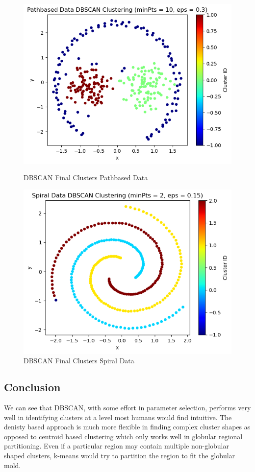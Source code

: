 \documentclass{article}
\begin{document}
\begin{figure}[H]
    \centering
    \begin{minipage}[b]{0.49\textwidth}
        \centering
        \includegraphics[width=\textwidth]{DB_final_pathbased.png}
        \caption{DBSCAN Final Clusters Pathbased Data}
    \end{minipage}
    \hfill
    \begin{minipage}[b]{0.49\textwidth}
        \centering
        \includegraphics[width=\textwidth]{DB_final_spiral.png}
        \caption{DBSCAN Final Clusters Spiral Data}
    \end{minipage}
\end{figure}

\subsection{Conclusion}
We can see that DBSCAN, with some effort in parameter selection, performs very well in identifying
clusters at a level most humans would find intuitive. The denisty based approach is much more flexible
in finding complex cluster shapes as opposed to centroid based clustering which only works well in
globular regional partitioning. Even if a particular region may contain multiple non-globular shaped
clusters, k-means would try to partition the region to fit the globular mold.
\end{document}
